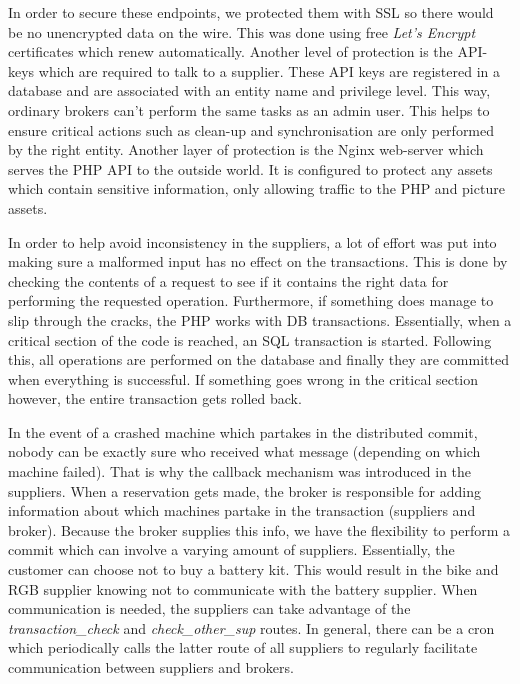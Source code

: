 \documentclass[10pt,a4paper,kul]{kulakarticle} %
\begin{document}
			In order to secure these endpoints, we protected them with SSL so there would be no unencrypted data on the wire. This was done using free \emph{Let's Encrypt} certificates which renew automatically. Another level of protection is the API-keys which are required to talk to a supplier. These API keys are registered in a  database and are associated with an entity name and privilege level. This way, ordinary brokers can't perform the same tasks as an admin user. This helps to ensure critical actions such as clean-up and synchronisation are only performed by the right entity. Another layer of protection is the Nginx web-server which serves the PHP API to the outside world. It is configured to protect any assets which contain sensitive information, only allowing traffic to the PHP and picture assets. 
			
			In order to help avoid inconsistency in the suppliers, a lot of effort was put into making sure a malformed input has no effect on the transactions. This is done by checking the contents of a request to see if it contains the right data for performing the requested operation. Furthermore, if something does manage to slip through the cracks, the PHP works with DB transactions. Essentially, when a critical section of the code is reached, an SQL transaction is started. Following this, all operations are performed on the database and finally they are committed when everything is successful. If something goes wrong in the critical section however, the entire transaction gets rolled back. 
			
			In the event of a crashed machine which partakes in the distributed commit, nobody can be exactly sure who received what message (depending on which machine failed). That is why the callback mechanism was introduced in the suppliers. When a reservation gets made, the broker is responsible for adding information about which machines partake in the transaction  (suppliers and broker). Because the broker supplies this info, we have the flexibility to perform a commit which can involve a varying amount of suppliers. Essentially, the customer can choose not to buy a battery kit. This would result in the bike and RGB supplier knowing not to communicate with the battery supplier. When communication is needed, the suppliers can take advantage of the \emph{transaction\_check} and \emph{check\_other\_sup} routes. In general, there can be a cron which periodically calls the latter route of all suppliers to regularly facilitate communication between suppliers and brokers. 
		
\end{document}
